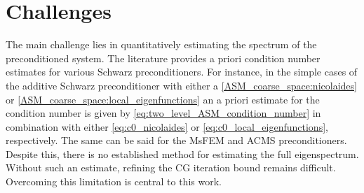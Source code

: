 \section{Challenges}\label{sec:challenges}
The main challenge lies in quantitatively estimating the spectrum of the preconditioned system. The literature provides a priori condition number estimates for various Schwarz preconditioners. For instance, in the simple cases of the additive Schwarz preconditioner with either a \cref{ASM_coarse_space:nicolaides} or \cref{ASM_coarse_space:local_eigenfunctions} an a priori estimate for the condition number is given by \cref{eq:two_level_ASM_condition_number} in combination with either \cref{eq:c0_nicolaides} or \cref{eq:c0_local_eigenfunctions}, respectively. The same can be said for the MsFEM and ACMS preconditioners. Despite this, there is no established method for estimating the full eigenspectrum. Without such an estimate, refining the CG iteration bound remains difficult. Overcoming this limitation is central to this work.